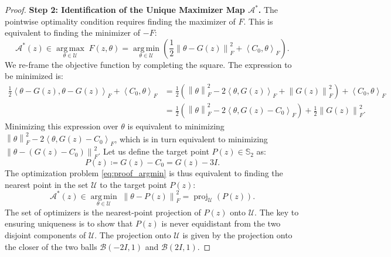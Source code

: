\documentclass[12pt, letterpaper]{amsart}
\newcommand{\Thetacal}{\mathcal{A}}
\newcommand{\Ucal}{\mathcal{U}}
\newcommand{\Bcal}{\mathcal{B}}
\newcommand{\norm}[1]{\left\lVert#1\right\rVert}
\newcommand{\scpr}[2]{\left\langle #1, #2 \right\rangle}
\DeclareMathOperator*{\argmax}{arg\,max}
\DeclareMathOperator*{\argmin}{arg\,min}
\DeclareMathOperator*{\proj}{proj}
\theoremstyle{plain}
\theoremstyle{definition}
\theoremstyle{remark}
\numberwithin{equation}{section} %
\begin{document}
\begin{appendices}
\begin{proof}
\vspace{1ex}
\noindent\textbf{Step 2: Identification of the Unique Maximizer Map \(\Thetacal^*\).}
The pointwise optimality condition requires finding the maximizer of \(F\). This is equivalent to finding the minimizer of \(-F\):
\begin{equation}
\label{eq:proof_argmin}
    \Thetacal^*(z) \in \underset{\theta \in \Ucal}{\argmax} \; F(z, \theta) = \underset{\theta \in \Ucal}{\argmin} \left( \frac{1}{2} \norm{\theta - G(z)}_F^2 + \scpr{C_0}{\theta}_F \right).
\end{equation}
We re-frame the objective function by completing the square. The expression to be minimized is:
\begin{align*}
    \frac{1}{2}\scpr{\theta - G(z)}{\theta - G(z)}_F + \scpr{C_0}{\theta}_F
    &= \frac{1}{2}\left( \norm{\theta}_F^2 - 2\scpr{\theta}{G(z)}_F + \norm{G(z)}_F^2 \right) + \scpr{C_0}{\theta}_F \\
    &= \frac{1}{2}\left( \norm{\theta}_F^2 - 2\scpr{\theta}{G(z) - C_0}_F \right) + \frac{1}{2}\norm{G(z)}_F^2.
\end{align*}
Minimizing this expression over \(\theta\) is equivalent to minimizing \(\norm{\theta}_F^2 - 2\scpr{\theta}{G(z) - C_0}_F\), which is in turn equivalent to minimizing \(\norm{\theta - (G(z) - C_0)}_F^2\). Let us define the target point \(P(z) \in \mathbb{S}_2\) as:
\[
    P(z) \coloneqq G(z) - C_0 = G(z) - 3I.
\]
The optimization problem \eqref{eq:proof_argmin} is thus equivalent to finding the nearest point in the set \(\Ucal\) to the target point \(P(z)\):
\[
    \Thetacal^*(z) \in \underset{\theta \in \Ucal}{\argmin} \; \norm{\theta - P(z)}_F^2 = \proj_{\Ucal}(P(z)).
\]
The set of optimizers is the nearest-point projection of \(P(z)\) onto \(\Ucal\). The key to ensuring uniqueness is to show that \(P(z)\) is never equidistant from the two disjoint components of \(\Ucal\). The projection onto \(\Ucal\) is given by the projection onto the closer of the two balls \(\Bcal(-2I,1)\) and \(\Bcal(2I,1)\).


\end{proof}
\end{appendices}
\end{document}
